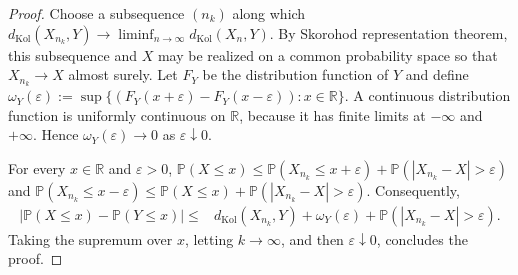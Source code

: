 \documentclass[10pt,a4paper]{amsart}
\newcommand{\PP}{\mathbb{P}}
\newcommand{\R}{\mathbb{R}}
\newcommand{\dK}{d_{\mathrm{Kol}}}
\newcommand{\eps}{\varepsilon}
\begin{document}
\begin{proof}
Choose a subsequence $(n_k)$ along which
$
\dK(X_{n_k},Y)
\to 
\liminf_{n\to\infty} \dK(X_n,Y).
$
By   Skorohod representation theorem, this subsequence and $X$ may
be realized on a common probability space so that
$X_{n_k}\to X$ almost surely.  Let $F_Y$ be the distribution function
of $Y$ and define
$\omega_Y(\eps)
  :=\sup\{   (F_Y(x+\eps)-F_Y(x-\eps)) :x\in\R \}.
  $
A continuous distribution function is uniformly continuous on $\R$,
because it has finite limits at $-\infty$ and $+\infty$.  Hence
$\omega_Y(\eps)\to0$ as $\eps\downarrow0$.

For every $x\in\R$ and $\eps>0$,
$
  \PP(X\leq x)
  \leq\PP(X_{n_k}\leq x+\eps)
  +\PP(|X_{n_k}-X|>\eps)
$
and
$
  \PP(X_{n_k}\leq x-\eps)
  \leq\PP(X\leq x)
  +\PP(|X_{n_k}-X|>\eps).
$
Consequently,
\[
\begin{aligned}
  \bigl|\PP(X\leq x)-\PP(Y\leq x)\bigr|
  \leq{}&\dK(X_{n_k},Y)+\omega_Y(\eps)
  +\PP(|X_{n_k}-X|>\eps).
\end{aligned}
\]
Taking the supremum over $x$, letting $k\to\infty$, and then 
$\eps\downarrow0$, concludes the proof. 
\end{proof}
\end{document}
